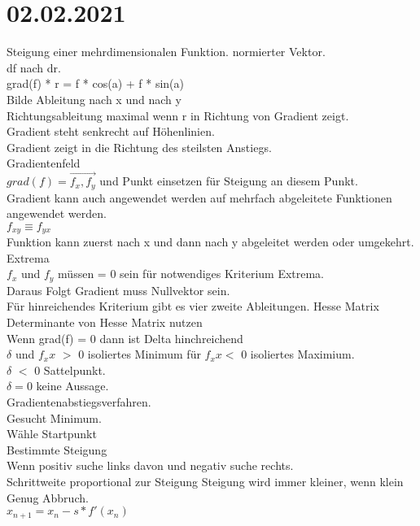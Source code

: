 \documentclass{article}
\begin{document}
	 \section*{02.02.2021}
	 Steigung einer mehrdimensionalen Funktion.
	 normierter Vektor. \\
	 df nach dr. \\
	 grad(f) * r = f * cos(a) + f * sin(a) \\
	 Bilde Ableitung nach x und nach y \\
	 Richtungsableitung maximal wenn r in Richtung von Gradient zeigt. \\
	 Gradient steht senkrecht auf Höhenlinien. \\
	 Gradient zeigt in die Richtung des steilsten Anstiegs. \\
	 Gradientenfeld \\
	 $grad(f) = \vec{f_x, f_y}$ und Punkt einsetzen für Steigung an diesem Punkt. \\
	 Gradient kann auch angewendet werden auf mehrfach abgeleitete Funktionen angewendet werden. \\
	 $f_{xy} \equiv f_{yx}$ \\
	 Funktion kann zuerst nach x und dann nach y abgeleitet werden oder umgekehrt. \\
	 Extrema \\
	 $f_x$ und $f_y$ müssen = 0 sein für notwendiges Kriterium Extrema. \\
	 Daraus Folgt Gradient muss Nullvektor sein. \\
	 Für hinreichendes Kriterium gibt es vier zweite Ableitungen. Hesse Matrix \\
	 Determinante von Hesse Matrix nutzen \\
	 Wenn grad(f) = 0 dann ist Delta hinchreichend \\
	 $\delta$ und $f_xx$ $>$ 0 isoliertes Minimum für $f_xx$$<$ 0 isoliertes Maximium. \\
	 $\delta$ $<$ 0 Sattelpunkt. \\
	 $\delta = 0$ keine Aussage. \\
	 Gradientenabstiegsverfahren. \\
	 Gesucht Minimum. \\
	 Wähle Startpunkt \\
	 Bestimmte Steigung \\
	 Wenn positiv suche links davon und negativ suche rechts. \\
	 Schrittweite proportional zur Steigung
	 Steigung wird immer kleiner, wenn klein Genug Abbruch. \\
	 $x_{n+1} = x_n -s * f'(x_n)$ \\
\end{document}
